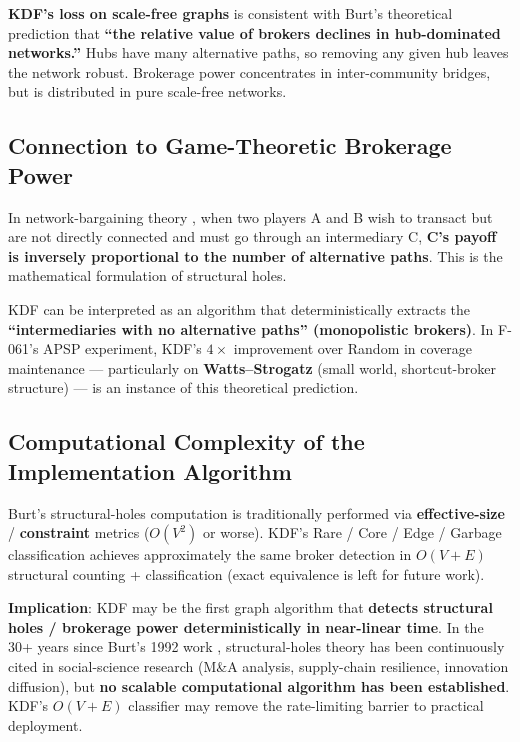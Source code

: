\textbf{KDF's loss on scale-free graphs} is consistent with Burt's theoretical prediction that \textbf{``the relative value of brokers declines in hub-dominated networks.''} Hubs have many alternative paths, so removing any given hub leaves the network robust. Brokerage power concentrates in inter-community bridges, but is distributed in pure scale-free networks.

\subsection{Connection to Game-Theoretic Brokerage Power}\label{connection-to-game-theoretic-brokerage-power}

In network-bargaining theory \citep{myerson1977graphs, calvoarmengol2004networks}, when two players A and B wish to transact but are not directly connected and must go through an intermediary C, \textbf{C's payoff is inversely proportional to the number of alternative paths}. This is the mathematical formulation of structural holes.

KDF can be interpreted as an algorithm that deterministically extracts the \textbf{``intermediaries with no alternative paths'' (monopolistic brokers)}. In F-061's APSP experiment, KDF's \(4 \times\) improvement over Random in coverage maintenance --- particularly on \textbf{Watts--Strogatz} (small world, shortcut-broker structure) --- is an instance of this theoretical prediction.

\subsection{Computational Complexity of the Implementation Algorithm}\label{computational-complexity-of-the-implementation-algorithm}

Burt's structural-holes computation is traditionally performed via \textbf{effective-size} / \textbf{constraint} metrics (\(O(V^2)\) or worse). KDF's Rare / Core / Edge / Garbage classification achieves approximately the same broker detection in \textbf{\(O(V + E)\)} structural counting + classification (exact equivalence is left for future work).

\textbf{Implication}: KDF may be the first graph algorithm that \textbf{detects structural holes / brokerage power deterministically in near-linear time}. In the 30+ years since Burt's 1992 work \citep{burt1992structuralholes}, structural-holes theory has been continuously cited in social-science research (M\&A analysis, supply-chain resilience, innovation diffusion), but \textbf{no scalable computational algorithm has been established}. KDF's \(O(V + E)\) classifier may remove the rate-limiting barrier to practical deployment.

